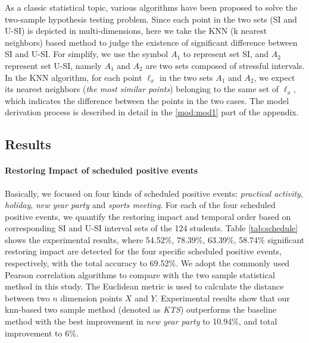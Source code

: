 As a classic statistical topic, various algorithms have been proposed to solve the two-sample hypothesis testing problem.
Since each point in the two sets (SI and U-SI) is depicted in multi-dimensions,
here we take the KNN (k nearest neighbors) \cite{Schilling1986Multivariate}
based method to judge the existence of significant difference between SI and U-SI.
For simplify, we use the symbol $A_1$ to represent set SI,
and $A_2$ represent set U-SI,
namely $A_1$ and $A_2$ are two sets composed of stressful intervals.
In the KNN algorithm,
for each point $\ell_{x}$ in the two sets $A_1$ and $A_2$,
we expect its nearest neighbors (\emph{the most similar points}) belonging to the same set of $\ell_x$,
which indicates the difference between the points in the two cases.
The model derivation process is described in detail in the \ref{mod:mod1} part of the appendix.


\subsection{Results}
\paragraph{Restoring Impact of scheduled positive events}
Basically, we focused on four kinds of scheduled positive events:
\emph{practical activity}, \emph{holiday}, \emph{new year party} and \emph{sports meeting}.
For each of the four scheduled positive events,
we quantify the restoring impact and temporal order
based on corresponding SI and U-SI interval sets of the 124 students.
Table \ref{tab:schedule} shows the experimental results,
where 54.52\%, 78.39\%, 63.39\%, 58.74\% significant restoring impact are detected for the four specific scheduled positive events, respectively, with the total accuracy to 69.52\%.
We adopt the commonly used Pearson correlation algorithms to compare with the two sample statistical method in this study.
The Euclidean metric is used to calculate the distance between two $n$ dimension points $X$ and $Y$.
Experimental results show that our knn-based two sample method (denoted as \emph{KTS}) outperforms the baseline method
with the best improvement in \emph{new year party} to 10.94\%,
and total improvement to 6\%.

